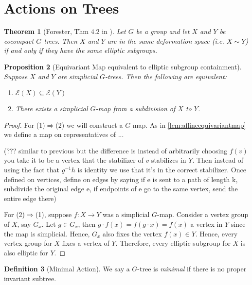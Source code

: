 \documentclass[12pt,parskip=full]{report}
\theoremstyle{plain}
\newtheorem{thm}{Theorem}[section]
\newtheorem{prop}[thm]{Proposition}
\theoremstyle{definition}
\newtheorem{dfn}[thm]{Definition}
\begin{document}
\section{Actions on Trees}

\begin{thm}[Forester, Thm 4.2 in \cite{foresterdeformationrigidity}]
\label{thm:forester}
Let $G$ be a group and let $X$ and $Y$ be cocompact $G$-trees. Then $X$ and $Y$ are in the same deformation space (i.e. $X\sim Y$) if and only if they have the same elliptic subgroups.
\end{thm}

\begin{prop}
[Equivariant Map equivalent to elliptic subgroup containment]
\label{pro:gmapfromsubset}
Suppose $X$ and $Y$ are simplicial \(G\)-trees. Then the following are equivalent:
\begin{enumerate}
    \item \(\mathcal{E}(X) \subseteq \mathcal{E}(Y)\)
    \item There exists a simplicial $G$-map from a subdivision of $X$ to $Y$.
\end{enumerate}
\end{prop}
\begin{proof}
    For (1)$\Rightarrow$(2) we will construct a $G$-map. As in \ref{lem:affineequivariantmap} we define a map on representatives of ...
    
    (??? similar to previous but the difference is instead of arbitrarily choosing \(f(v)\) you take it to be a vertex that the stabilizer of \(v\) stabilizes in \(Y\). Then instead of using the fact that \(g^{-1}h\) is identity we use that it's in the correct stabilizer. Once defined on vertices, define on edges by saying if e is sent to a path of length k, subdivide the original edge e, if endpoints of e go to the same vertex, send the entire edge there)
    
    
    
    For (2)$\Rightarrow$(1), suppose $f:X\to Y$ was a simplicial $G$-map. Consider a vertex group of $X$, say $G_x$. Let $g\in G_x$, then $g\cdot f(x)=f(g\cdot x)=f(x)$ a vertex in $Y$ since the map is simplicial. Hence, $G_x$ also fixes the vertex $f(x)\in Y$. Hence, every vertex group for $X$ fixes a vertex of $Y$. Therefore, every elliptic subgroup for $X$ is also elliptic for $Y$.
\end{proof}

\begin{dfn}
    [Minimal Action]
    \label{defn:minimal}
    We say a $G$-tree is \emph{minimal} if there is no proper invariant subtree.
\end{dfn}
\end{document}

